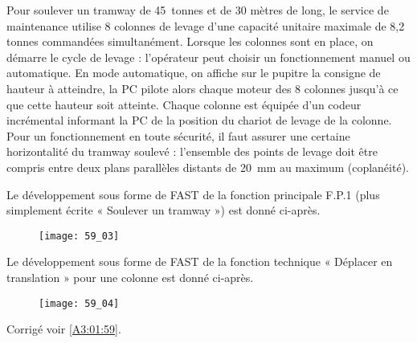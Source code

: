 Pour soulever un tramway de \SI{45}{tonnes} et de 30 mètres de long, le service de maintenance utilise 8
colonnes de levage d'une capacité unitaire maximale de 8,2 tonnes commandées simultanément. Lorsque les colonnes sont en place, on démarre le cycle de levage :
l’opérateur peut choisir un fonctionnement manuel ou automatique. En mode automatique, on
affiche sur le pupitre la consigne de hauteur à atteindre, la PC pilote alors chaque moteur des 8
colonnes jusqu’à ce que cette hauteur soit atteinte. Chaque colonne est équipée d’un codeur
incrémental informant la PC de la position du chariot de levage de la colonne. Pour un
fonctionnement en toute sécurité, il faut assurer une certaine horizontalité du tramway soulevé :
l'ensemble des points de levage doit être compris entre deux plans parallèles distants de \SI{20}{mm} au
maximum (coplanéité).



\begin{multicols}{2}

Le développement sous forme de FAST de la fonction principale F.P.1 (plus simplement écrite
« Soulever un tramway ») est donné ci-après.


\begin{figure}[H]
\centering
\texttt{[image: 59\_03]}
\end{figure}

Le développement sous forme de FAST de la fonction technique « Déplacer en translation » pour
une colonne est donné ci-après.

\begin{figure}[H]
\centering
\texttt{[image: 59\_04]}
\end{figure}
\end{multicols}

\fi




\ifprof
\else
\begin{flushright}
\footnotesize{Corrigé  voir \ref{A3:01:59}.}
\end{flushright}%
\fi